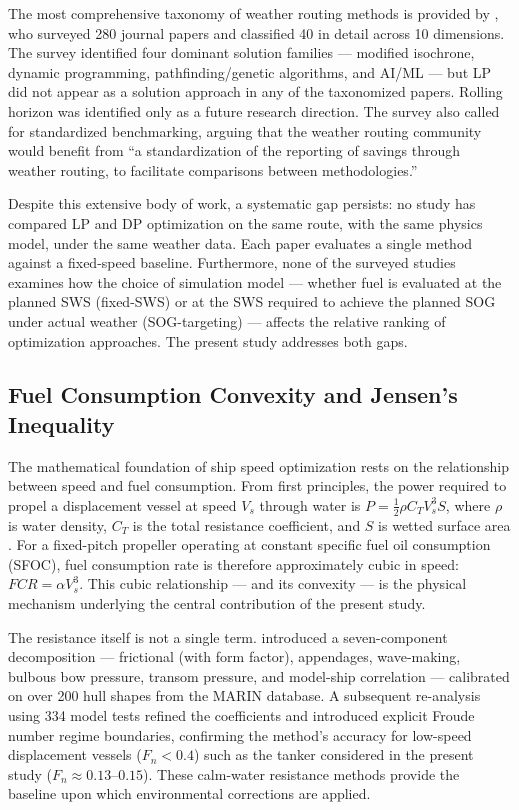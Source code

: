 \documentclass[review,authoryear]{elsarticle}  %
\begin{document}
The most comprehensive taxonomy of weather routing methods is provided by \citet{Zis2020}, who surveyed 280 journal papers and classified 40 in detail across 10 dimensions. The survey identified four dominant solution families --- modified isochrone, dynamic programming, pathfinding/genetic algorithms, and AI/ML --- but LP did not appear as a solution approach in any of the taxonomized papers. Rolling horizon was identified only as a future research direction. The survey also called for standardized benchmarking, arguing that the weather routing community would benefit from ``a standardization of the reporting of savings through weather routing, to facilitate comparisons between methodologies.''

Despite this extensive body of work, a systematic gap persists: no study has compared LP and DP optimization on the same route, with the same physics model, under the same weather data. Each paper evaluates a single method against a fixed-speed baseline. Furthermore, none of the surveyed studies examines how the choice of simulation model --- whether fuel is evaluated at the planned SWS (fixed-SWS) or at the SWS required to achieve the planned SOG under actual weather (SOG-targeting) --- affects the relative ranking of optimization approaches. The present study addresses both gaps.

\subsection{Fuel Consumption Convexity and Jensen's Inequality}
\label{sec:lit-convexity}

The mathematical foundation of ship speed optimization rests on the relationship between speed and fuel consumption. From first principles, the power required to propel a displacement vessel at speed $V_s$ through water is $P = \frac{1}{2} \rho C_T V_s^3 S$, where $\rho$ is water density, $C_T$ is the total resistance coefficient, and $S$ is wetted surface area \citet{Psaraftis2023}. For a fixed-pitch propeller operating at constant specific fuel oil consumption (SFOC), fuel consumption rate is therefore approximately cubic in speed: $FCR = \alpha V_s^3$. This cubic relationship --- and its convexity --- is the physical mechanism underlying the central contribution of the present study.

The resistance itself is not a single term. \citet{Holtrop1982} introduced a seven-component decomposition --- frictional (with form factor), appendages, wave-making, bulbous bow pressure, transom pressure, and model-ship correlation --- calibrated on over 200 hull shapes from the MARIN database. A subsequent re-analysis using 334 model tests \citet{Holtrop1984} refined the coefficients and introduced explicit Froude number regime boundaries, confirming the method's accuracy for low-speed displacement vessels ($F_n < 0.4$) such as the tanker considered in the present study ($F_n \approx 0.13$--$0.15$). These calm-water resistance methods provide the baseline upon which environmental corrections are applied.
\end{document}
